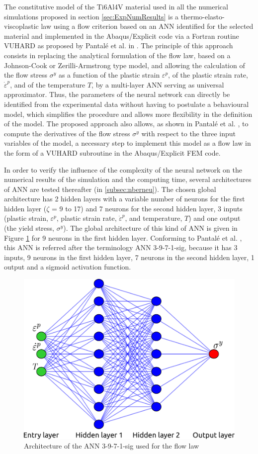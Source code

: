 \documentclass[preprint,12pt,times]{elsarticle}
\begin{document}
The constitutive model of the Ti6Al4V material used in all the numerical simulations proposed in section \ref{sec:ExpNumResults} is a thermo-elasto-viscoplastic law using a flow criterion based on an ANN identified for the selected material and implemented in the Abaqus/Explicit code via a Fortran routine VUHARD as proposed by Pantalé et al. in \cite{pantale_Efficient_2022}.
The principle of this approach consists in replacing the analytical formulation of the flow law, based on a Johnson-Cook or Zerilli-Armstrong type model, and allowing the calculation of the flow stress $\sigma^y$ as a function of the plastic strain $\varepsilon^p$, of the plastic strain rate, ${\dot{\varepsilon}}^p$, and of the temperature $T$, by a multi-layer ANN serving as universal approximator. Thus, the parameters of the neural network can directly be identified from the experimental data without having to postulate a behavioural model, which simplifies the procedure and allows more flexibility in the definition of the model.
The proposed approach also allows, as shown in Pantalé et al. \cite{pantale_Efficient_2022}, to compute the derivatives of the flow stress $\sigma^y$ with respect to the three input variables of the model, a necessary step to implement this model as a flow law in the form of a VUHARD subroutine in the Abaqus/Explicit FEM code.

In order to verify the influence of the complexity of the neural network on the numerical results of the simulation and the computing time, several architectures of ANN are tested thereafter (in \ref{subsec:nberneu}). The chosen global architecture has 2 hidden layers with a variable number of neurons for the first hidden layer ($\zeta$ = 9 to 17) and 7 neurons for the second hidden layer, 3 inputs (plastic strain, $\varepsilon^p$, plastic strain rate, ${\dot{\varepsilon}}^p$, and temperature, $T$) and one output (the yield stress, $\sigma^y$). The global architecture of this kind of ANN is given in Figure \ref{ANN} for 9 neurons in the first hidden layer. Conforming to Pantalé et al. \cite{pantale_Efficient_2022}, this ANN is referred after the terminology ANN 3-9-7-1-sig, because it has 3 inputs, 9 neurons in the first hidden layer, 7 neurons in the second hidden layer, 1 output and a sigmoid activation function.

\begin{figure}[h]
\centering
\includegraphics[width = 90 mm]{Figures/ANN}
\caption{Architecture of the ANN 3-9-7-1-sig used for the flow law}
\label{ANN}
\end{figure}
\end{document}

